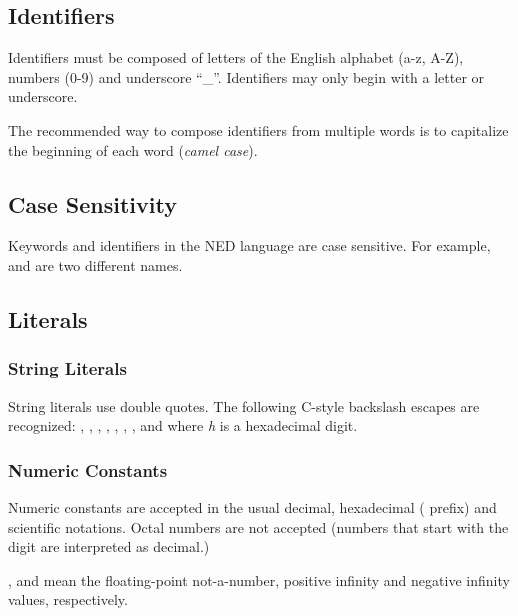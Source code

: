 \subsection{Identifiers}
\label{sec:ned-ref:identifiers}

Identifiers must be composed of letters of the English alphabet (a-z, A-Z),
numbers (0-9) and underscore ``\_''. Identifiers may only begin with a
letter or underscore.

The recommended way to compose identifiers from multiple words is to
capitalize the beginning of each word (\textit{camel case}).


\subsection{Case Sensitivity}
\label{sec:ned-ref:case-sensitivity}

Keywords and identifiers in the NED language are case sensitive. For example,
 and  are two different names.


\subsection{Literals}
\label{sec:ned-ref:literals}

\subsubsection{String Literals}
\label{sec:ned-ref:string-literals}

String literals use double quotes. The following C-style backslash escapes
are recognized: , ,
, , ,
\ttt{{\textbackslash}{\textbackslash}}, , and
 where \textit{h} is a hexadecimal digit.

\subsubsection{Numeric Constants}
\label{sec:ned-ref:numeric-constants}

Numeric constants are accepted in the usual decimal, hexadecimal ( prefix)
and scientific notations. Octal numbers are not accepted (numbers that start
with the  digit are interpreted as decimal.)

,  and \ttt{-} mean the floating-point
not-a-number, positive infinity and negative infinity values, respectively.

